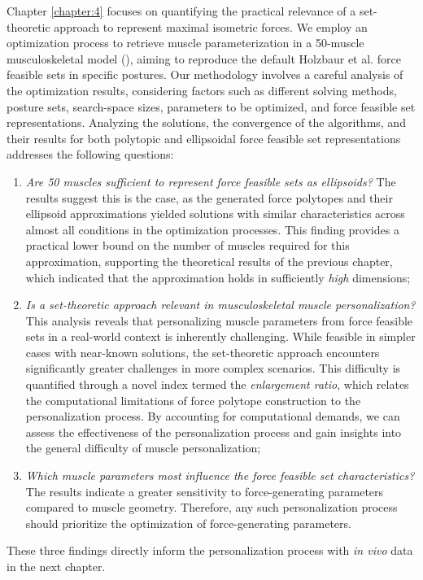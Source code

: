 Chapter \ref{chapter:4} focuses on quantifying the practical relevance of a set-theoretic approach to represent maximal isometric forces. We employ an optimization process to retrieve muscle parameterization in a 50-muscle musculoskeletal model (\cite{holzbaurModelUpperExtremity2005}), aiming to reproduce the default Holzbaur et al. force feasible sets in specific postures. Our methodology involves a careful analysis of the optimization results, considering factors such as different solving methods, posture sets, search-space sizes, parameters to be optimized, and force feasible set representations. Analyzing the solutions, the convergence of the algorithms, and their results for both polytopic and ellipsoidal force feasible set representations addresses the following questions:
\begin{enumerate}
    \item {\emph{Are 50 muscles sufficient to represent force feasible sets as ellipsoids?} The results suggest this is the case, as the generated force polytopes and their ellipsoid approximations yielded solutions with similar characteristics across almost all conditions in the optimization processes. This finding provides a practical lower bound on the number of muscles required for this approximation, supporting the theoretical results of the previous chapter, which indicated that the approximation holds in sufficiently \emph{high} dimensions;}
    \item {\emph{Is a set-theoretic approach relevant in musculoskeletal muscle personalization?} This analysis reveals that personalizing muscle parameters from force feasible sets in a real-world context is inherently challenging. While feasible in simpler cases with near-known solutions, the set-theoretic approach encounters significantly greater challenges in more complex scenarios. This difficulty is quantified through a novel index termed the \emph{enlargement ratio}, which relates the computational limitations of force polytope construction to the personalization process. By accounting for computational demands, we can assess the effectiveness of the personalization process and gain insights into the general difficulty of muscle personalization; }
    \item {\emph{Which muscle parameters most influence the force feasible set characteristics?} The results indicate a greater sensitivity to force-generating parameters compared to muscle geometry. Therefore, any such personalization process should prioritize the optimization of force-generating parameters.}
\end{enumerate}
These three findings directly inform the personalization process with \emph{in vivo} data in the next chapter.

